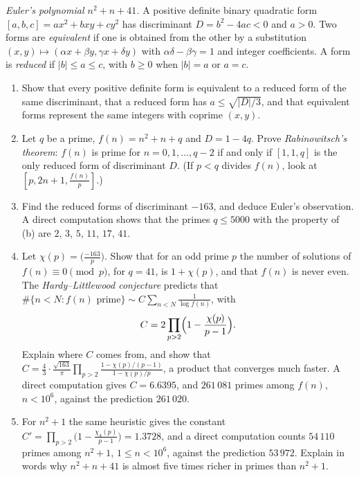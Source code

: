 \begin{exercise}[$\star\star\star$]\label{pb:euler41}
\emph{Euler's polynomial $n^2+n+41$.} A positive definite binary quadratic form $[a,b,c]=ax^2+bxy+cy^2$ has discriminant $D=b^2-4ac<0$ and $a>0$. Two forms are
\emph{equivalent} if one is obtained from the other by a substitution $(x,y)\mapsto(\alpha x+\beta y,\gamma x+\delta y)$ with $\alpha\delta-\beta\gamma=1$ and integer
coefficients. A form is \emph{reduced} if $|b|\le a\le c$, with $b\ge0$ when $|b|=a$ or $a=c$.
\begin{enumerate}[label=(\alph*)]
\item Show that every positive definite form is equivalent to a reduced form of the same discriminant, that a reduced form has $a\le\sqrt{|D|/3}$, and that equivalent
forms represent the same integers with coprime $(x,y)$.
\item Let $q$ be a prime, $f(n)=n^2+n+q$ and $D=1-4q$. Prove \emph{Rabinowitsch's theorem}: $f(n)$ is prime for $n=0,1,\dots,q-2$ if and only if $[1,1,q]$ is the only
reduced form of discriminant $D$. (If $p<q$ divides $f(n)$, look at $[p,2n+1,\frac{f(n)}p]$.)
\item Find the reduced forms of discriminant $-163$, and deduce Euler's observation. A direct computation shows that the primes $q\le5000$ with the property of (b) are $2$, $3$,
$5$, $11$, $17$, $41$.
\item Let $\chi(p)=\bigl(\frac{-163}p\bigr)$. Show that for an odd prime $p$ the number of solutions of $f(n)\equiv0\pmod p$, for $q=41$, is $1+\chi(p)$, and that $f(n)$ is
never even. The \emph{Hardy--Littlewood conjecture} predicts that $\#\{n<N:f(n)\text{ prime}\}\sim C\sum_{n<N}\frac1{\log f(n)}$, with
\[
C=2\prod_{p>2}\Bigl(1-\frac{\chi(p)}{p-1}\Bigr).
\]
Explain where $C$ comes from, and show that $C=\frac43\cdot\frac{\sqrt{163}}\pi\prod_{p>2}\frac{1-\chi(p)/(p-1)}{1-\chi(p)/p}$, a product that converges much faster.
A direct computation gives $C=6.6395$, and $261\,081$ primes among $f(n)$, $n<10^6$, against the prediction $261\,020$.
\item For $n^2+1$ the same heuristic gives the constant $C'=\prod_{p>2}\bigl(1-\frac{\chi_4(p)}{p-1}\bigr)=1.3728$, and a direct computation counts $54\,110$ primes among
$n^2+1$, $1\le n<10^6$, against the prediction $53\,972$. Explain in words why $n^2+n+41$ is almost five times richer in primes than $n^2+1$.
\end{enumerate}
\end{exercise}


